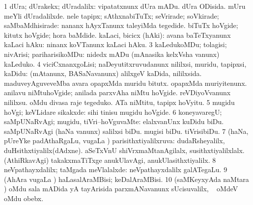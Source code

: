 \bentry
{}
\gl{\kirxvi}
\bmng
\bnum
\num{1} dUra; dUrakekx; dUradalilx:  vipatatxnunx dUra mADu.  dUra ODisida.  mUru meYli dUradalilxde. 
\banum
{} nele tapipx; sAthxnabiTuTx; seVrirade; soVkirade; saMbaMdhisirade:  nananx hAyxTanunx taleyiMda tegedide.  biTuTx hoVgide; kitutx hoVgide; hora baMdide. 
 kaLaci, bicicx (hAki):  avana baTeTxyanunx kaLaci hAku:  ninanx koVTanunx kaLaci hAku. 
\eanum
\numie
\num{3} kaLedukoMDu; tolagisi; nivArisi; pariharisikoMDu:  nidedx mADu (mAnasika kelxVsha \mo vanunx) kaLeduko. 
\num{4} viciCxnanxgoLisi; naDeyutitxruvudanunx nililxsi, muridu, tapipxsi, kaDidu:  (mAtanunx, BASaNavanunx) alilxgeV kaDida, nililxsida.  maduveyAguveveMba avara opapxMda muridu bitutx.  opapxMda muriyitenunx.  anilavu niMtuhoVgide; anilada parxvAha niMtu hoVgide.  reVDiyoVvanunx nililxsu.  oMdu divasa raje tegeduko.  ATa niMtitu, tapipx hoVyitu. 
\num{5} mugidu hoVgi; keVLidare sikakxde:  sihi tinisu mugidu hoVgide. 
\num{6} koneyavaregU; saMpUNaRvAgi; mugidu, tiVri--hoVguvaMte:  elalxvanUnx kuDidu biDu.  saMpUNaRvAgi (haNa \mo vanunx) salilxsi biDu.  mugisi biDu.  tiVrisibiDu. 
\num{7} (haNa, pUreYke padAthaRgaLu, \mo vugaLa \vi) parisithxtiyalilxruva:  dudaRsheyalilx, duHsithxtiyalilx(dAdxne).  aSeTxVnU shiVrxmaMtanAgilalx, susithxtiyalilxlalx.  (AthiRkavAgi) takakxmaTiTxge anukUlavAgi, anukUlasithxtiyalilx. 
\num{8} neVpathayxdalilx; taMgada meVlalalxde:  neVpathayxdalilx galATegaLu. 
\num{9} (AhAra \mo vugaLa \vi) haLasalAraMBisi; keDalAraMBisi. 
\num{10} (saMKeyxyAda naMtara \parx) oMdu sala mADida yA tayArisida parxmANavanunx sUcisuvalilx, \kanmu\  oMdeV oMdu obebx. 
\enum
\emng

